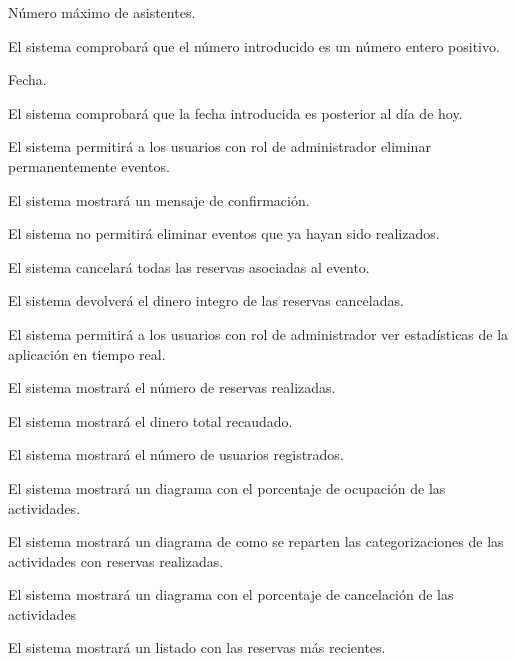 \begin{enumitem}[label=\bfseries{RAdm \arabic*.},leftmargin=*]
\begin{enumitem}[label*=\bfseries{\arabic*.}]
\begin{enumitem}[label*=\bfseries{\arabic*.}]
\begin{enumitem}[label*=\bfseries{\arabic*.}]
			\end{enumitem}
			\item Número máximo de asistentes.
			\begin{enumitem}[label*=\bfseries{\arabic*.}]
				\item El sistema comprobará que el número introducido es un número entero positivo.
			\end{enumitem}
			\item Fecha.
			\begin{enumitem}[label*=\bfseries{\arabic*.}]
				\item El sistema comprobará que la fecha introducida es posterior al día de hoy.
			\end{enumitem}
		\end{enumitem}
	\end{enumitem}
	\item El sistema permitirá a los usuarios con rol de administrador eliminar permanentemente eventos.
	\begin{enumitem}[label*=\bfseries{\arabic*.}]
		\item El sistema mostrará un mensaje de confirmación.
		\item El sistema no permitirá eliminar eventos que ya hayan sido realizados.
		\item El sistema cancelará todas las reservas asociadas al evento.
		\begin{enumitem}[label*=\bfseries{\arabic*.}]
			\item El sistema devolverá el dinero integro de las reservas canceladas.
		\end{enumitem}
	\end{enumitem}
	\item El sistema permitirá a los usuarios con rol de administrador ver estadísticas de la aplicación en tiempo real.
	\begin{enumitem}[label*=\bfseries{\arabic*.}]
		\item El sistema mostrará el número de reservas realizadas.
		\item El sistema mostrará el dinero total recaudado.
		\item El sistema mostrará el número de usuarios registrados.
		\item El sistema mostrará un diagrama con el porcentaje de ocupación de las actividades.
		\item El sistema mostrará un diagrama de como se reparten las categorizaciones de las actividades con reservas realizadas.
		\item El sistema mostrará un diagrama con el porcentaje de cancelación de las actividades
		\item El sistema mostrará un listado con las reservas más recientes.
	\end{enumitem}
\end{enumitem}
